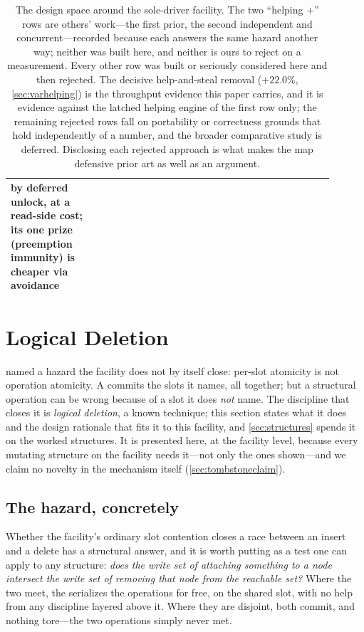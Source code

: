 \documentclass[11pt]{article}
\begin{document}
\begin{table}[tp]
\begin{tabular}{@{}p{0.26\linewidth} p{0.40\linewidth} p{0.24\linewidth}@{}}
  by deferred unlock, at a read-side cost; its one prize (preemption immunity)
  is cheaper via avoidance &
  \citet{guerraoui2020mcas} \\
\bottomrule
\end{tabular}
\caption{The design space around the sole-driver facility. The two
``helping $+$'' rows are others' work---the first prior, the second independent
and concurrent---recorded because each answers the same hazard another way;
neither was built here, and neither is ours to reject on a measurement. Every
other row was built or seriously considered here and then rejected. The decisive
help-and-steal
removal ($+22.0\%$, \cref{sec:varhelping}) is the throughput evidence this paper
carries, and it is evidence against the latched helping engine of the first row
only; the remaining rejected rows fall on portability or correctness grounds
that hold independently of a number, and the broader comparative study is
deferred. Disclosing each rejected approach is what makes the map defensive prior
art as well as an argument.}
\label{tab:variations}
\end{table}

\section{Logical Deletion}
\label{sec:tombstone}

 named a hazard the facility does not by itself close:
per-slot atomicity is not operation atomicity. A \kcas commits the slots it
names, all together; but a structural operation can be wrong because of a slot it
does \emph{not} name. The discipline that closes it is \emph{logical deletion}, a
known technique; this section states what it does and the design rationale that
fits it to this facility, and \cref{sec:structures} spends it on the worked
structures. It is presented here, at the facility level, because every mutating
structure on the facility needs it---not only the ones shown---and we claim no
novelty in the mechanism itself (\cref{sec:tombstoneclaim}).

\subsection{The hazard, concretely}
\label{sec:hazard}

Whether the facility's ordinary slot contention closes a race between an insert
and a delete has a structural answer, and it is worth putting as a test one can
apply to any structure: \emph{does the write set of attaching something to a node
intersect the write set of removing that node from the reachable set?} Where the
two meet, the \kcas serializes the operations for free, on the shared slot, with
no help from any discipline layered above it. Where they are disjoint, both
commit, and nothing tore---the two operations simply never met.
\end{document}
